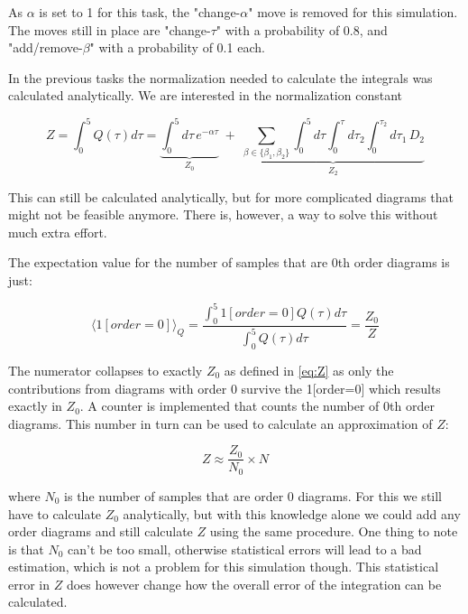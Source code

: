 \documentclass[a4paper, 11pt]{article}          %
\begin{document}
    As $\alpha$ is set to 1 for this task, the "change-$\alpha$" move is removed for this simulation. The moves still in place are "change-$\tau$" with a probability of 0.8, and "add/remove-$\beta$" with a probability of 0.1 each.

    In the previous tasks the normalization needed to calculate the integrals was calculated analytically. We are interested in the normalization constant

    \begin{equation}\label{eq:Z}
        Z=\int_0^5 Q(\tau) d\tau = \underbrace{\int_0^5 d\tau\, e^{-\alpha\tau}}_{Z_0}\;+\;
\underbrace{\sum_{\beta \in \{\beta_1,\beta_2\}} \int_0^5 d\tau \int_0^{\tau} d\tau_2 \int_0^{\tau_2} d\tau_1\,D_2}_{Z_2}
    \end{equation}

    This can still be calculated analytically, but for more complicated diagrams that might not be feasible anymore. There is, however, a way to solve this without much extra effort.

    The expectation value for the number of samples that are 0th order diagrams is just:

    \begin{equation*}
        \langle 1[order=0] \rangle_Q = \frac{\int_0^5 1[order=0] Q(\tau) d\tau}{\int_0^5 Q(\tau) d\tau} = \frac{Z_0}{Z}
    \end{equation*}

    The numerator collapses to exactly $Z_0$ as defined in \eqref{eq:Z} as only the contributions from diagrams with order 0 survive the 1[order=0] which results exactly in $Z_0$. A counter is implemented that counts the number of 0th order diagrams. This number in turn can be used to calculate an approximation of $Z$:

    \begin{equation}\label{eq:Z_final}
        Z \approx \frac{Z_0}{N_0} \times N
    \end{equation}

    where $N_0$ is the number of samples that are order 0 diagrams. For this we still have to calculate $Z_0$ analytically, but with this knowledge alone we could add any order diagrams and still calculate $Z$ using the same procedure. One thing to note is that $N_0$ can't be too small, otherwise statistical errors will lead to a bad estimation, which is not a problem for this simulation though. This statistical error in $Z$ does however change how the overall error of the integration can be calculated.
\end{document}
